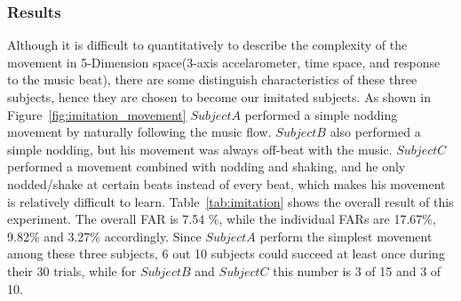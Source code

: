 \subsubsection{Results}
Although it is difficult to quantitatively to describe the complexity of the movement in 5-Dimension space(3-axis accelarometer, time space,  and response to the music beat), there are some distinguish characteristics of these three subjects, hence they are chosen to become our imitated subjects. As shown in Figure~\ref{fig:imitation_movement} $Subject A$ performed a simple nodding movement by naturally following the music flow. $Subject B$ also performed a simple nodding, but his movement was always off-beat with the music. $Subject C$ performed a movement combined with nodding and shaking, and he only nodded/shake at certain beats instead of every beat, which makes his movement is relatively difficult to learn. Table~\ref{tab:imitation} shows the overall result of this experiment. The overall FAR is 7.54 \%, while the individual FARs are 17.67\%, 9.82\% and 3.27\% accordingly.  Since $Subject A$ perform the simplest movement among these three subjects, 6 out 10 subjects could succeed at least once during their 30 trials, while for $Subject B$ and $Subject C$ this number is 3 of 15 and 3 of 10.

